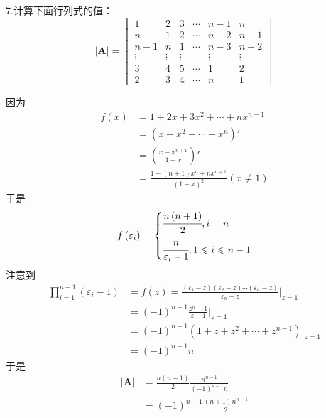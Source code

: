7.计算下面行列式的值：
\[
\left|\bm{A}\right|=\begin{vmatrix}
	1&2&3&\cdots&n-1&n\\
	n&1&2&\cdots&n-2&n-1\\
	n-1&n&1&\cdots&n-3&n-2\\
	\vdots&\vdots&\vdots&&\vdots&\vdots\\
	3&4&5&\cdots&1&2\\
	2&3&4&\cdots&n&1
\end{vmatrix}
\]
\begin{solution}
因为\begin{align*}
	f\left(x\right)&=1+2x+3x^2+\cdots+nx^{n-1}\\
	&=\left(x+x^2+\cdots+x^n\right)'
\\
&=
\left(\frac{x-x^{n+1}}{1-x}\right)'\\
&=\frac{1-\left(n+1\right)x^n+nx^{n+1}}{\left(1-x\right)^2}\left(x\neq 1
\right)
\end{align*}
于是\[
f\left(\varepsilon_i\right)=\begin{cases*}
\cfrac{n\left(n+1\right)}{2},i=n\\
\cfrac{n}{\varepsilon_i-1},1\leqslant i\leqslant n-1
\end{cases*}
\]
注意到\begin{align*}
	\prod_{i=1}^{n-1}\left(\varepsilon_i-1\right)&=f\left(z\right)=\frac{\left(\varepsilon_1-z\right)\left(\varepsilon_2-z\right)\cdots\left(\varepsilon_n-z\right)}{\varepsilon_n-z}\Bigg|_{z=1}\\
	&=\left(-1\right)^{n-1}\frac{z^n-1}{z-1}\Bigg|_{z=1}\\
	&=\left(-1\right)^{n-1}\left(1+z+z^2+\cdots+z^{n-1}\right)\Bigg|_{z=1}\\
	&=\left(-1\right)^{n-1}n
\end{align*}
于是\begin{align*}
	\left|\bm{A}\right|&=\frac{n\left(n+1\right)}{2}\frac{n^{n-1}}{\left(-1\right)^{n-1}n}\\
	&=\left(-1\right)^{n-1}\frac{\left(n+1\right)n^{n-1}}{2}
\end{align*}
\end{solution}
